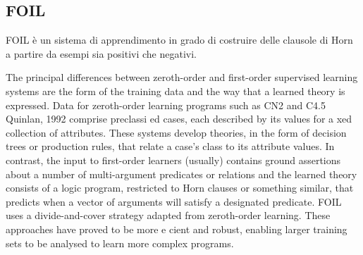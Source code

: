 \subsection{FOIL}
\nocite{Quinlan:1993:FMR:645323.649599}
FOIL è un sistema di apprendimento in grado di costruire delle clausole di Horn a partire da esempi sia positivi che negativi.

The principal differences between zeroth-order and first-order supervised learning systems are the form of the training data and the way that a learned theory is expressed. Data for zeroth-order learning programs such as CN2 and C4.5 Quinlan, 1992 comprise preclassi ed cases, each described by its values for a xed collection of attributes.
These systems develop theories, in the form of decision trees or production rules, that relate a case's class to its attribute values. In contrast, the input to first-order learners (usually) contains ground assertions about a number of multi-argument predicates or relations and the learned theory consists of a logic program, restricted to Horn clauses or something similar, that predicts when a vector of arguments will satisfy a designated predicate.
FOIL uses a divide-and-cover strategy adapted from zeroth-order learning. These approaches have proved to be more e cient and robust, enabling larger training sets to be analysed to learn more complex programs.


